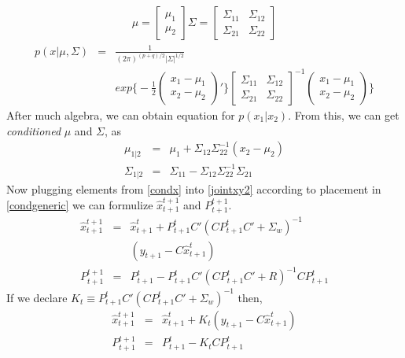 \documentclass[a4paper,11pt]{article}
\begin{document}
\begin{eqnarray}
\mu = 
\left[ \begin{array}{c}
      \mu_1 \\
      \mu_2
      \end{array} \right]           
\Sigma = 
\left[ \begin{array}{cc}
      \Sigma_{11} & \Sigma_{12}\\
      \Sigma_{21} & \Sigma_{22}
      \end{array} \right] \label{condgeneric}
\end{eqnarray}
\begin{eqnarray*}
p(x|\mu,\Sigma) &=& \frac{1}{(2\pi)^{(p+q)/2}|\Sigma|^{1/2}} \\
&& exp\bigg\{
-\frac{1}{2}
\left( \begin{array}{c}
      x_1 - \mu_1 \\
      x_2 - \mu_2
      \end{array} \right)'
\bigg\}
\left[ \begin{array}{cc}
      \Sigma_{11} & \Sigma_{12}\\
      \Sigma_{21} & \Sigma_{22}
      \end{array} \right]^{-1}
\left( \begin{array}{c}
      x_1 - \mu_1 \\
      x_2 - \mu_2
      \end{array} \right)
\bigg\} 
\end{eqnarray*}
After much algebra, we can obtain equation for $p(x_1|x_2)$. From this, we can
get {\em conditioned} $\mu$ and $\Sigma$, as
\begin{eqnarray}
\mu_{1|2} &=& \mu_1 + \Sigma_{12}\Sigma_{22}^{-1}(x_2 - \mu_2) \label{condx} \\
\Sigma_{1|2} &=& \Sigma_{11}-\Sigma_{12}\Sigma_{22}^{-1}\Sigma_{21} \nonumber
\end{eqnarray}
Now plugging elements from  \eqref{condx} into \eqref{jointxy2} according
to placement in \eqref{condgeneric} we can formulize $\hat{x}_{t+1}^{t+1}$ and
$P_{t+1}^{t+1}$. 
\begin{eqnarray*}
\hat{x}_{t+1}^{t+1} &=& \hat{x}_{t+1}^t + P_{t+1}^tC'
                  (CP_{t+1}^tC'+ \Sigma_{w})^{-1} \\
               &&   (y_{t+1} - C\hat{x}_{t+1}^t) \\
P_{t+1}^{t+1} &=& P_{t+1}^t - P_{t+1}^tC' (CP_{t+1}^tC' + R)^{-1}CP_{t+1}^t
\end{eqnarray*}
If we declare $K_t \equiv P_{t+1}^tC' (CP_{t+1}^tC'+ \Sigma_{w})^{-1}$ then,
\begin{eqnarray}
\hat{x}_{t+1}^{t+1} &=& \hat{x}_{t+1}^t + K_t (y_{t+1} -
C\hat{x}_{t+1}^t) \label{xtplus1} \\
P_{t+1}^{t+1} &=& P_{t+1}^t - K_t C P_{t+1}^t
\end{eqnarray}
\end{document}
